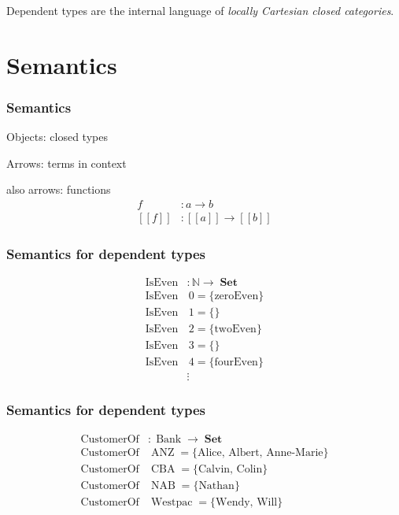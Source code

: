 \documentclass[
xcolor={usenames,dvipsnames,svgnames},
]{beamer}
\DeclareMathOperator{\Set}{\mathbf{Set}}
\DeclareMathOperator{\ANZ}{ANZ}
\DeclareMathOperator{\NAB}{NAB}
\DeclareMathOperator{\CBA}{CBA}
\DeclareMathOperator{\Westpac}{Westpac}
\DeclareMathOperator{\Bank}{Bank}
\DeclareMathOperator{\IsEven}{IsEven}
\DeclareMathOperator{\CustomerOf}{CustomerOf}
\newcommand{\N}{\ensuremath{\mathbb{N}}}
\begin{document}
  \begin{frame}
    Dependent types are the internal language of \textit{locally Cartesian closed categories}.
  \end{frame}

  \section{Semantics}

  \begin{frame}
    \frametitle{Semantics}
    Objects: closed types

    Arrows: terms in context

    also arrows: functions
    \begin{align*}
      f &: a \to b \\
      [\![f]\!]  &: [\![a]\!] \to [\![b]\!]
    \end{align*}
  \end{frame}

  \begin{frame}
    \frametitle{Semantics for dependent types}
    \begin{align*}
      \IsEven&: \N \to \Set  \\
      \IsEven &\, 0 = \{ \textrm{zeroEven} \} \\
      \IsEven &\, 1 = \{ \textrm{} \} \\
      \IsEven &\, 2 = \{ \textrm{twoEven} \} \\
      \IsEven &\, 3 = \{ \textrm{} \} \\
      \IsEven &\, 4 = \{ \textrm{fourEven} \} \\
      &\vdots
    \end{align*}
  \end{frame}

  \begin{frame}
    \frametitle{Semantics for dependent types}
    \begin{align*}
      \CustomerOf&: \Bank \to \Set  \\
      \CustomerOf& \ANZ = \{ \textrm{Alice, Albert, Anne-Marie} \} \\
      \CustomerOf& \CBA = \{ \textrm{Calvin, Colin} \} \\
      \CustomerOf& \NAB = \{ \textrm{Nathan} \} \\
      \CustomerOf& \Westpac = \{ \textrm{Wendy, Will} \} \\
    \end{align*}

  \end{frame}
\end{document}
